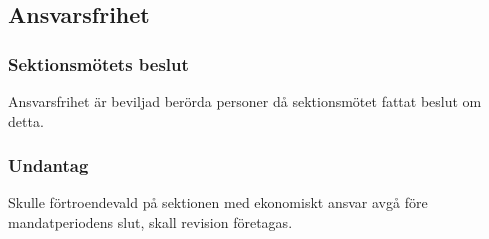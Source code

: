 \subsection{Ansvarsfrihet}

\subsubsection{Sektionsmötets beslut}
Ansvarsfrihet är beviljad berörda personer då sektionsmötet fattat beslut om detta.

\subsubsection{Undantag}
Skulle förtroendevald på sektionen med ekonomiskt ansvar avgå före mandatperiodens slut, skall revision företagas.